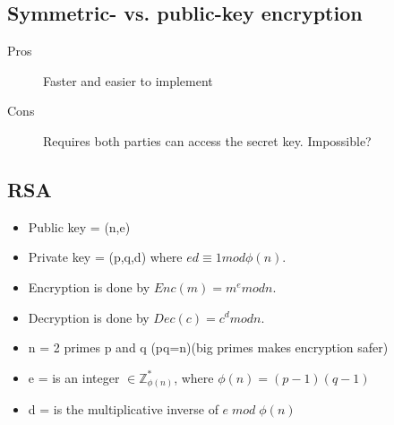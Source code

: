 \subsection{Symmetric- vs. public-key encryption}
\begin{description}
\item[Pros] Faster and easier to implement
\item[Cons] Requires both parties can access the secret key. Impossible?
\end{description}

\subsection*{RSA}
\begin{itemize}
\item Public key = (n,e) 
\item Private key = (p,q,d) where $ed \equiv 1 mod \phi (n)$.
\item Encryption is done by $Enc(m)= m^e mod n$.
\item Decryption is done by $Dec(c)=c^d mod n$.	
\item n = 2 primes p and q (pq=n)(big primes makes encryption safer)
\item e = is an integer $\in \mathbb{Z}^*_{\phi (n)}$, where $\phi (n)=(p-1)(q-1)$
\item d = is the multiplicative inverse of $e\; mod\;\phi (n)$
\end{itemize}

